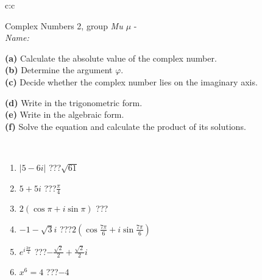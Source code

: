 \documentclass[10pt]{report}
\begin{document}
\newpage
\thispagestyle{empty}
\begin{tabular}{c:c}
\begin{minipage}[c][104.5mm][t]{0.5\linewidth}
\begin{center}
\vspace{5mm}
{\huge Complex Numbers 2, group \textit{Mu $\mu$} -}\\[5mm]
\textit{Name:}\phantom{xxxxxxxxxxxxxxxxxxxxxxxxxxxxxxxxxxxxxxxxxxxxxxxxxxxxxxxxxxxxxxxxx}\\[5mm]
\begin{minipage}{0.95\linewidth}
\begin{center}
{\small \begin{minipage}{0.44\textwidth} \raggedright
\textbf{(a)} Calculate the absolute value of the complex number. \\[1mm]
\textbf{(b)} Determine the argument \(\varphi\). \\[1mm]
\textbf{(c)} Decide whether the complex number lies on the imaginary axis. \end{minipage} \begin{minipage}{0.54\textwidth}
\textbf{(d)} Write in the trigonometric form. \\[1mm]
\textbf{(e)} Write in the algebraic form. \\[1mm]
\textbf{(f)} Solve the equation and calculate the product of its solutions.
\end{minipage}
}
\end{center}
\end{minipage}
\\[1mm]
\begin{minipage}{0.79\linewidth}
\begin{center}
\begin{varwidth}{\linewidth}
\setlength{\itemsep}{0pt}
\begin{enumerate}
\large
\item $|5-6i|$\quad \dotfill\; ???\;\dotfill \quad $\sqrt{61}$
\item $5+5i$\quad \dotfill\; ???\;\dotfill \quad $\frac{\pi}{4}$
\item $2\left(\cos{\pi}+i\sin{\pi}\right)$\quad \dotfill\; ???\;\dotfill \quad {}
\item $-1-\sqrt{3}i$\quad \dotfill\; ???\;\dotfill \quad $2\left(\cos{\frac{7\pi}{6}}+i\sin{\frac{7\pi}{6}}\right)$
\item $e^{i\frac{3\pi}{4}}$\quad \dotfill\; ???\;\dotfill \quad $-\frac{\sqrt{2}}{2}+\frac{ \sqrt{2}}{2}i$
\item $x^6=4$\quad \dotfill\; ???\;\dotfill \quad $-4$

\end{enumerate}
\end{varwidth}
\end{center}
\end{minipage}
\end{center}
\end{minipage}
\end{tabular}
\end{document}
